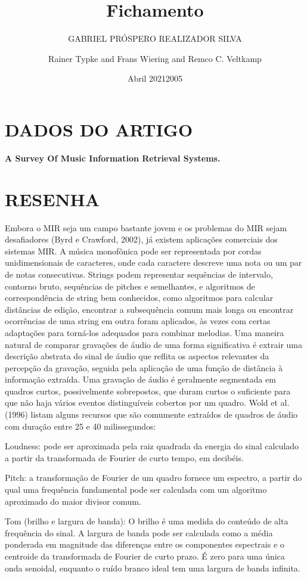 \documentclass{article}
\title{Fichamento}
\author{GABRIEL PRÓSPERO REALIZADOR  SILVA}
\date{Abril 2021}
\begin{document}
\maketitle

\section{DADOS DO ARTIGO}
\textbf{A Survey Of Music Information Retrieval Systems. \\}
\author{Rainer Typke and Frans Wiering and Remco C. Veltkamp \\}
\date{2005}

\section{RESENHA}
Embora o MIR seja um campo bastante jovem e os problemas do MIR sejam desafiadores (Byrd e Crawford, 2002), já existem aplicações comerciais dos sistemas MIR.
A música monofônica pode ser representada por cordas unidimensionais de caracteres, onde cada caractere descreve uma nota ou um par de notas consecutivas. Strings podem representar sequências de intervalo, contorno bruto, sequências de pitches e semelhantes, e algoritmos de correspondência de string bem conhecidos, como algoritmos para calcular distâncias de edição, encontrar a subsequência comum mais longa ou encontrar ocorrências de uma string em outra foram aplicados, às vezes com certas adaptações para torná-los adequados para combinar melodias.
Uma maneira natural de comparar gravações de áudio de uma forma significativa é extrair uma descrição abstrata do sinal de áudio que reflita os aspectos relevantes da percepção da gravação, seguida pela aplicação de uma função de distância à informação extraída. Uma gravação de áudio é geralmente segmentada em quadros curtos, possivelmente sobrepostos, que duram curtos o suficiente para que não haja vários eventos distinguíveis cobertos por um quadro.
Wold et al. (1996) listam alguns recursos que são comumente extraídos de quadros de áudio com duração entre 25 e 40 milissegundos:

Loudness: pode ser aproximada pela raiz quadrada da energia do sinal calculado a partir da transformada de Fourier de curto tempo, em decibéis.

Pitch: a transformação de Fourier de um quadro fornece um espectro, a partir do qual uma frequência fundamental pode ser calculada com um algoritmo aproximado do maior divisor comum.

Tom (brilho e largura de banda): O brilho é uma medida do conteúdo de alta frequência do sinal. A largura de banda pode ser calculada como a média ponderada em magnitude das diferenças entre os componentes espectrais e o centroide da transformada de Fourier de curto prazo. É zero para uma única onda senoidal, enquanto o ruído branco ideal tem uma largura de banda infinita.
\end{document}

